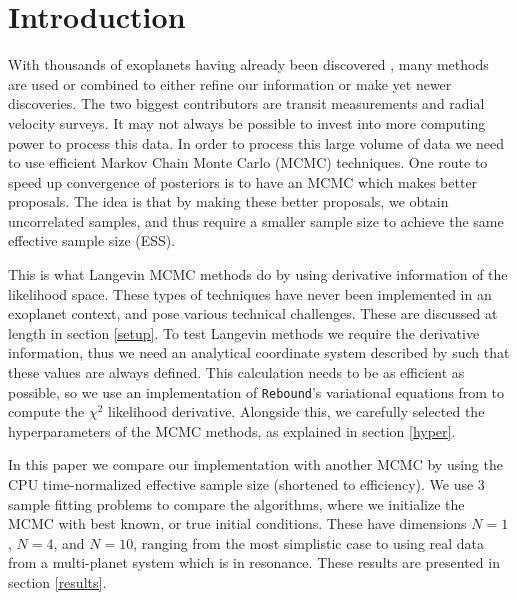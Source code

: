 \documentclass{aa}
\begin{document}

   \maketitle
%
\section{Introduction}
With thousands of exoplanets having already been discovered \cite{exoArchive}, many methods are used or combined to either refine our information or make yet newer discoveries. The two biggest contributors are transit measurements and radial velocity surveys. It may not always be possible to invest into more computing power to process this data. In order to process this large volume of data we need to use efficient Markov Chain Monte Carlo (MCMC) techniques. One route to speed up convergence of posteriors is to have an MCMC which makes better proposals. The idea is that by making these better proposals, we obtain uncorrelated samples, and thus require a smaller sample size to achieve the same effective sample size (ESS).

This is what Langevin MCMC methods do by using derivative information of the likelihood space. These types of techniques have never been implemented in an exoplanet context, and pose various technical challenges. These are discussed at length in section \ref{setup}. To test Langevin methods we require the derivative information, thus we need an analytical coordinate system described by \cite{Pl2009} such that these values are always defined. This calculation needs to be as efficient as possible, so we use an implementation of \texttt{Rebound}'s variational equations from \cite{Rein2016} to compute the $\chi^2$ likelihood derivative. Alongside this, we carefully selected the hyperparameters of the MCMC methods, as explained in section \ref{hyper}.

In this paper we compare our implementation with another MCMC by using the CPU time-normalized effective sample size (shortened to efficiency). We use 3 sample fitting problems to compare the algorithms, where we initialize the MCMC with best known, or true initial conditions. These have dimensions $N=1$, $N=4$, and $N=10$, ranging from the most simplistic case to using real data from a multi-planet system which is in resonance. These results are presented in section \ref{results}.
 
\end{document}

